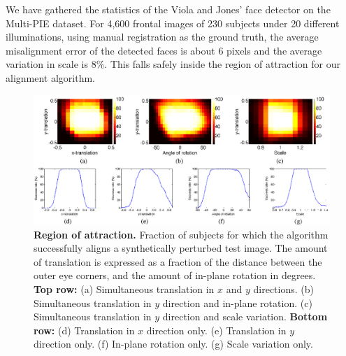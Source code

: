 \documentclass[10pt,journal,letterpaper,compsoc]{IEEEtran}
\begin{document}
We have gathered the statistics of the Viola and Jones'
 face detector on the Multi-PIE dataset. For 4,600 frontal
 images of 230 subjects under 20 different illuminations,
 using manual registration as the ground truth, the average
 misalignment error of the detected faces is about 6 pixels
 and the average variation in scale is 8\%. This falls
 safely inside the region of attraction for our alignment
 algorithm.
\begin{figure}
\centering
\includegraphics{Figure_3}
\caption{{\bf Region of attraction.} Fraction of
subjects for which the algorithm successfully aligns a
synthetically perturbed test image.  The amount of translation
is expressed as a fraction of the distance between the outer
eye corners, and the amount of in-plane rotation in degrees.
{\bf Top row:} (a) Simultaneous translation in $x$ and $y$
directions. (b) Simultaneous translation in $y$ direction and
in-plane rotation. (c) Simultaneous translation in $y$
direction and scale variation. {\bf Bottom row:} (d)
Translation in $x$ direction only. (e) Translation in $y$
direction only. (f) In-plane rotation only. (g) Scale variation
only.} \label{fig:attraction} \vspace{-4mm}
\end{figure}
\end{document}
